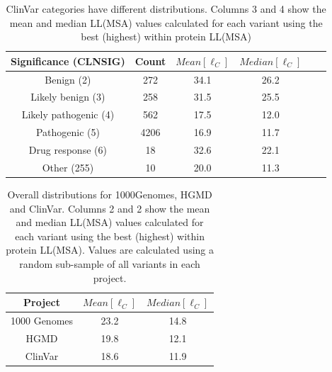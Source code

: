 \begin{table}[h]
\begin{tabular}{|c|c|c|c|c|c|}
\hline 
Significance (CLNSIG)   &   Count  & $Mean[\ell_C]$  &  $Median[\ell_C]$ \\
\hline 
Benign (2)              &    272   &      34.1       &    26.2     \\
Likely benign (3)       &    258   &      31.5       &    25.5     \\
Likely pathogenic (4)   &    562   &      17.5       &    12.0     \\
Pathogenic (5)          &   4206   &      16.9       &    11.7     \\
Drug response (6)       &     18   &      32.6       &    22.1     \\
Other (255)             &     10   &      20.0       &    11.3     \\
\hline 
\end{tabular}
\caption{ClinVar categories have different distributions. Columns 3 and 4 show the mean and median LL(MSA) values calculated for each variant using the best (highest) within protein LL(MSA)} 
\label{tab:gwas_clinvar}
\end{table}

\begin{table}[h]
\begin{tabular}{|c|c|c|}
\hline 
Project      & $Mean[\ell_C]$  &  $Median[\ell_C]$ \\
\hline 
1000 Genomes &            23.2 &          14.8  \\
HGMD         &            19.8 &          12.1  \\
ClinVar      &            18.6 &          11.9  \\
\hline 
\end{tabular} 
\caption{Overall distributions for 1000Genomes, HGMD and ClinVar. Columns 2 and 2 show the mean and median LL(MSA) values calculated for each variant using the best (highest) within protein LL(MSA). Values are calculated using a random sub-sample of all variants in each project.}
\label{tab:gwas_1Kg}
\end{table}
